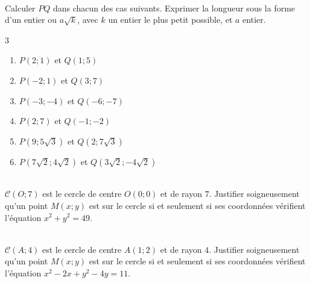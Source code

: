 \documentclass[main.tex]{subfiles}
\begin{document}
\begin{exercise} \label{chapter06:exercice:distances:entrainement} 
	\hfill \\
	Calculer $PQ$  dans chacun des cas suivants. Exprimer la longueur sous la forme d'un entier ou $a\sqrt{k}$, avec $k$ un entier le plus petit possible, et $a$ entier.
	\begin{multicols}{3}
		\begin{enumerate}[label=\alph*),leftmargin=* ]
			\item $P(2;1)$ et $Q(1;5)$
			\item $P(-2;1)$ et $Q(3;7)$
			\item $P(-3;-4)$ et $Q(-6;-7)$
			\item $P(2;7)$ et $Q(-1;-2)$ 
			\item $P(9;5\sqrt{3})$ et $Q(2;7\sqrt{3})$ 
			\item $P(7\sqrt{2};4\sqrt{2})$ et $Q(3\sqrt{2};-4\sqrt{2})$ 
		\end{enumerate}
	\end{multicols}
\end{exercise} 
\begin{exercise}\label{chapter06:exercice:distances:cercle03} 
	\hfill \\
	$\mathscr{C}(O;7)$ est le cercle de centre $O(0;0)$ et de rayon $7$. Justifier soigneusement qu'un point $M(x;y)$ est sur le cercle si et seulement si ses coordonnées vérifient l'équation $x^2+y^2=49$. 
\end{exercise}
\begin{exercise}\label{chapter06:exercice:distances:cercle04} 
	\hfill \\
	$\mathscr{C}(A;4)$ est le cercle de centre $A(1;2)$ et de rayon $4$. Justifier soigneusement qu'un point $M(x;y)$ est sur le cercle si et seulement si ses coordonnées vérifient l'équation $x^2-2x+y^2-4y=11$. 
\end{exercise}
%
\end{document}
